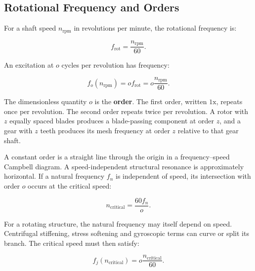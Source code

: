 \subsection{Rotational Frequency and Orders}

For a shaft speed $ n_{\mathrm{rpm}} $ in revolutions per minute, the rotational
frequency is:

\begin{equation}\label{rotational-frequency-from-rpm}
    f_{\mathrm{rot}} = \frac{n_{\mathrm{rpm}}}{60}.
\end{equation}

An excitation at $ o $ cycles per revolution has frequency:

\begin{bbox}
    \begin{equation}\label{order-frequency-line}
        f_o(n_{\mathrm{rpm}})
        = o f_{\mathrm{rot}}
        = o\frac{n_{\mathrm{rpm}}}{60}.
    \end{equation}
\end{bbox}

The dimensionless quantity $ o $ is the \textbf{order}. The first order, written
$ 1\mathrm{x} $, repeats once per revolution. The second order repeats twice per
revolution. A rotor with $ z $ equally spaced blades produces a blade-passing
component at order $ z $, and a gear with $ z $ teeth produces its mesh frequency
at order $ z $ relative to that gear shaft.

A constant order is a straight line through the origin in a frequency--speed
Campbell diagram. A speed-independent structural resonance is approximately
horizontal. If a natural frequency $ f_n $ is independent of speed, its
intersection with order $ o $ occurs at the critical speed:

\begin{equation}\label{constant-natural-frequency-critical-speed}
    n_{\mathrm{critical}}
    = \frac{60 f_n}{o}.
\end{equation}

For a rotating structure, the natural frequency may itself depend on speed.
Centrifugal stiffening, stress softening and gyroscopic terms can curve or split
its branch. The critical speed must then satisfy:

\begin{equation}\label{general-critical-speed-intersection}
    f_j(n_{\mathrm{critical}})
    = o\frac{n_{\mathrm{critical}}}{60}.
\end{equation}

